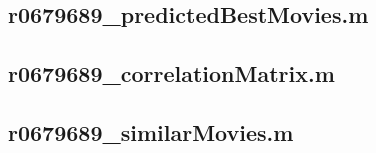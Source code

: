 \documentclass[11pt, a4paper, titlepage, openright]{article}
\begin{document}
    \subsection{r0679689\_predictedBestMovies.m}
		
    \subsection{r0679689\_correlationMatrix.m}
		
    \subsection{r0679689\_similarMovies.m}
		
\end{document}
